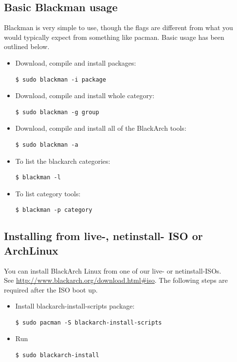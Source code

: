 \documentclass[a4paper, oneside, 11pt]{book}
\begin{document}
\subsection{Basic Blackman usage} Blackman is very simple to use, though the flags are different from what you
would typically expect from something like pacman. Basic usage has been outlined below.  
\begin{itemize}
\item Download, compile and install packages:
{\small
\color{gray}
\begin{verbatim}
$ sudo blackman -i package
\end{verbatim}
}
\item Download, compile and install whole category:
{\small
\color{gray}
\begin{verbatim}
$ sudo blackman -g group
\end{verbatim}
}
\item Download, compile and install all of the BlackArch tools:
{\small
\color{gray}
\begin{verbatim}
$ sudo blackman -a
\end{verbatim}
}
\item To list the blackarch categories:
{\small
\color{gray}
\begin{verbatim}
$ blackman -l
\end{verbatim}
}
\item To list category tools:
{\small
\color{gray}
\begin{verbatim}
$ blackman -p category
\end{verbatim}
}
\end{itemize}

\subsection{Installing from live-, netinstall- ISO or ArchLinux}
You can install BlackArch Linux from one of our live- or netinstall-ISOs.\\See
\url{http://www.blackarch.org/download.html#iso}. The following steps are
required after the ISO boot up.
\begin{itemize}
\item Install blackarch-install-scripts package:
{\small
\color{gray}
\begin{verbatim}
$ sudo pacman -S blackarch-install-scripts
\end{verbatim}
}
\item Run
{\small
\color{gray}
\begin{verbatim}
$ sudo blackarch-install
\end{verbatim}
}
\end{itemize}
\end{document}
